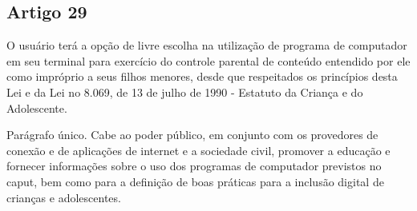 \subsection{Artigo 29}
O usuário terá a opção de livre escolha na utilização de programa de computador em seu terminal para exercício do controle parental de conteúdo entendido por ele como impróprio a seus filhos menores, desde que respeitados os princípios desta Lei e da Lei no 8.069, de 13 de julho de 1990 - Estatuto da Criança e do Adolescente.

Parágrafo único. Cabe ao poder público, em conjunto com os provedores de conexão e de aplicações de internet e a sociedade civil, promover a educação e fornecer informações sobre o uso dos programas de computador previstos no caput, bem como para a definição de boas práticas para a inclusão digital de crianças e adolescentes.